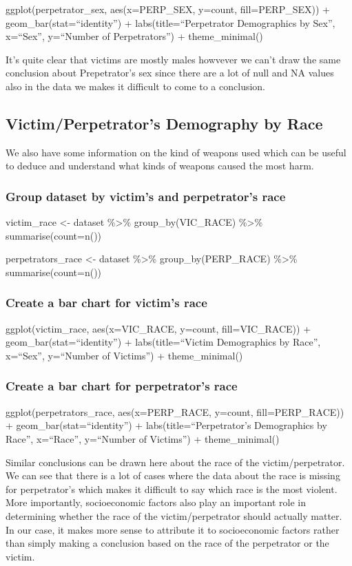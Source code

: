\documentclass[
]{article}
\begin{document}
ggplot(perpetrator\_sex, aes(x=PERP\_SEX, y=count, fill=PERP\_SEX)) +
geom\_bar(stat=``identity'') + labs(title=``Perpetrator Demographics by
Sex'', x=``Sex'', y=``Number of Perpetrators'') + theme\_minimal()

It's quite clear that victims are mostly males howvever we can't draw
the same conclusion about Prepetrator's sex since there are a lot of
null and NA values also in the data we makes it difficult to come to a
conclusion.

\subsection{Victim/Perpetrator's Demography by
Race}\label{victimperpetrators-demography-by-race}

We also have some information on the kind of weapons used which can be
useful to deduce and understand what kinds of weapons caused the most
harm.

\subsubsection{Group dataset by victim's and perpetrator's
race}\label{group-dataset-by-victims-and-perpetrators-race}

victim\_race \textless- dataset \%\textgreater\% group\_by(VIC\_RACE)
\%\textgreater\% summarise(count=n())

perpetrators\_race \textless- dataset \%\textgreater\%
group\_by(PERP\_RACE) \%\textgreater\% summarise(count=n())

\subsubsection{Create a bar chart for victim's
race}\label{create-a-bar-chart-for-victims-race}

ggplot(victim\_race, aes(x=VIC\_RACE, y=count, fill=VIC\_RACE)) +
geom\_bar(stat=``identity'') + labs(title=``Victim Demographics by
Race'', x=``Sex'', y=``Number of Victims'') + theme\_minimal()

\subsubsection{Create a bar chart for perpetrator's
race}\label{create-a-bar-chart-for-perpetrators-race}

ggplot(perpetrators\_race, aes(x=PERP\_RACE, y=count, fill=PERP\_RACE))
+ geom\_bar(stat=``identity'') + labs(title=``Perpetrator's Demographics
by Race'', x=``Race'', y=``Number of Victims'') + theme\_minimal()

Similar conclusions can be drawn here about the race of the
victim/perpetrator. We can see that there is a lot of cases where the
data about the race is missing for perpetrator's which makes it
difficult to say which race is the most violent. More importantly,
socioeconomic factors also play an important role in determining whether
the race of the victim/perpetrator should actually matter. In our case,
it makes more sense to attribute it to socioeconomic factors rather than
simply making a conclusion based on the race of the perpetrator or the
victim.
\end{document}

